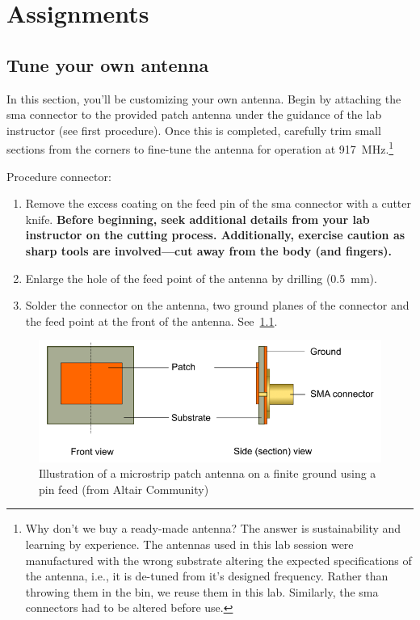 \chapter{Assignments}\label{ch:assignments}

\section{Tune your own antenna}
In this section, you'll be customizing your own antenna. Begin by attaching the \gls{sma} connector to the provided patch antenna under the guidance of the lab instructor (see first procedure). Once this is completed, carefully trim small sections from the corners to fine-tune the antenna for operation at \SI{917}{\mega\hertz}.\footnote{Why don't we buy a ready-made antenna? The answer is sustainability and learning by experience. The antennas used in this lab session were manufactured with the wrong substrate altering the expected specifications of the antenna, i.e., it is de-tuned from it's designed frequency. Rather than throwing them in the bin, we reuse them in this lab. Similarly, the \gls{sma} connectors had to be altered before use.}

Procedure connector:
\begin{enumerate}
    \item Remove the excess coating on the feed pin of the \gls{sma} connector with a cutter knife. \textbf{Before beginning, seek additional details from your lab instructor on the cutting process. Additionally, exercise caution as sharp tools are involved—cut away from the body (and fingers).}
    \item Enlarge the hole of the feed point of the antenna by drilling (\SI{0.5}{mm}).
    \item Solder the connector on the antenna, two ground planes of the connector and the feed point at the front of the antenna. See~\cref{fig:patch}.
\end{enumerate}

\begin{figure}[hbtp]
    \centering
    \includegraphics[width=0.8\linewidth]{figs/patch_microstrip_pin_fed.png}
    \caption{Illustration of a microstrip patch antenna on a finite ground using a pin feed (from Altair Community)}\label{fig:patch}
\end{figure}

